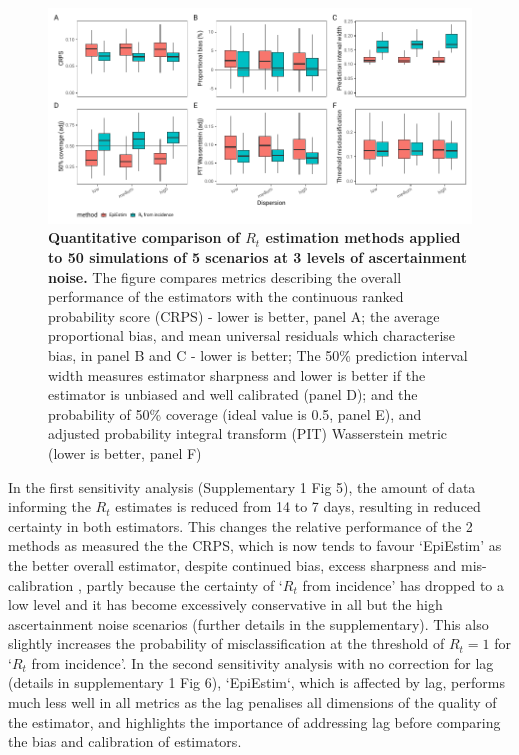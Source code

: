 \documentclass[10pt,letterpaper]{article}
\begin{document}
\begin{figure}[!ht]
\centerline{\includegraphics{fig/fig2-comparison}}
\caption{{\bf Quantitative comparison of $R_t$ estimation methods applied to 50 simulations of 5 scenarios at 3 levels of ascertainment noise.} The figure compares metrics describing the overall performance of the estimators with the continuous ranked probability score (CRPS) - lower is better, panel A; the average proportional bias, and mean universal residuals which characterise bias, in panel B and C - lower is better; The 50\% prediction interval width measures estimator sharpness and lower is better if the estimator is unbiased and well calibrated (panel D); and the probability of 50\% coverage (ideal value is 0.5, panel E), and adjusted probability integral transform (PIT) Wasserstein metric (lower is better, panel F)}
\label{fig2}
\end{figure}

In the first sensitivity analysis (Supplementary 1 Fig 5), the amount of data informing the $R_t$ estimates is reduced from 14 to 7 days, resulting in reduced certainty in both estimators. This changes the relative performance of the 2 methods as measured the the CRPS, which is now tends to favour `EpiEstim' as the better overall estimator, despite continued bias, excess sharpness and mis-calibration , partly because the certainty of `$R_t$ from incidence' has dropped to a low level and it has become excessively conservative in all but the high ascertainment noise scenarios (further details in the supplementary). This also slightly increases the probability of misclassification at the threshold of $R_t=1$ for `$R_t$ from incidence'. In the second sensitivity analysis with no correction for lag (details in supplementary 1 Fig 6), `EpiEstim`, which is affected by lag, performs much less well in all metrics as the lag penalises all dimensions of the quality of the estimator, and highlights the importance of addressing lag before comparing the bias and calibration of estimators.
\end{document}
